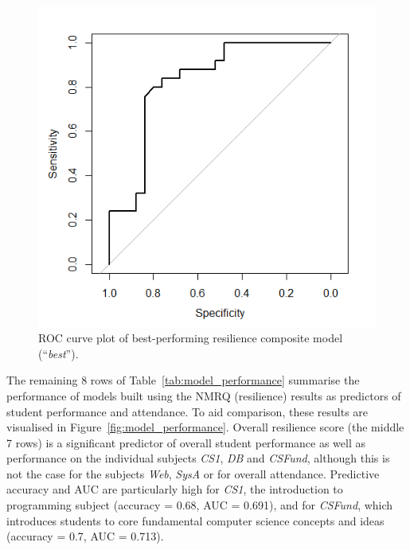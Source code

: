 \documentclass[sigconf]{acmart}
\begin{document}
\begin{figure} [h]
\centering
\includegraphics[width=.98\linewidth]{images/ROC_best_model.png}
\caption{ROC curve plot of best-performing resilience composite model (``{\em best}'').}
\label{fig:roc_curve} 
\end{figure}

The remaining 8 rows of Table~\ref{tab:model_performance} summarise the performance of models built using the NMRQ (resilience) results as predictors of student performance and attendance. To aid comparison, these results are visualised in Figure~\ref{fig:model_performance}. Overall resilience score (the middle 7 rows) is a significant predictor of overall student performance as well as performance on the individual subjects {\em CS1}, {\em DB} and {\em CSFund}, although this is not the case for the subjects {\em Web}, {\em SysA} or for overall attendance. Predictive accuracy and AUC are particularly high for {\em CS1}, the introduction to programming subject (accuracy = 0.68, AUC = 0.691), and for {\em CSFund}, which introduces students to core fundamental computer science concepts and ideas (accuracy = 0.7, AUC = 0.713).
\end{document}
